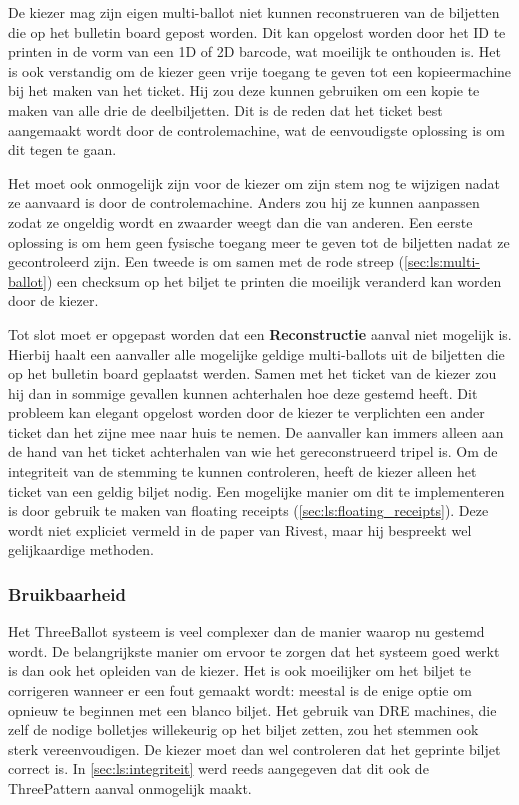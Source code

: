 \npar De kiezer mag zijn eigen multi-ballot niet kunnen reconstrueren van de biljetten die op het bulletin board gepost worden. Dit kan opgelost worden door het ID te printen in de vorm van een 1D of 2D barcode, wat moeilijk te onthouden is. Het is ook verstandig om de kiezer geen vrije toegang te geven tot een kopieermachine bij het maken van het ticket. Hij zou deze kunnen gebruiken om een kopie te maken van alle drie de deelbiljetten. Dit is de reden dat het ticket best aangemaakt wordt door de controlemachine, wat de eenvoudigste oplossing is om dit tegen te gaan.

\npar Het moet ook onmogelijk zijn voor de kiezer om zijn stem nog te wijzigen nadat ze aanvaard is door de controlemachine. Anders zou hij ze kunnen aanpassen zodat ze ongeldig wordt en zwaarder weegt dan die van anderen. Een eerste oplossing is om hem geen fysische toegang meer te geven tot de biljetten nadat ze gecontroleerd zijn. Een tweede is om samen met de rode streep (\ref{sec:ls:multi-ballot}) een checksum op het biljet te printen die moeilijk veranderd kan worden door de kiezer.

\npar Tot slot moet er opgepast worden dat een \textbf{Reconstructie} aanval niet mogelijk is. Hierbij haalt een aanvaller alle mogelijke geldige multi-ballots uit de biljetten die op het bulletin board geplaatst werden. Samen met het ticket van de kiezer zou hij dan in sommige gevallen kunnen achterhalen hoe deze gestemd heeft. Dit probleem kan elegant opgelost worden door de kiezer te verplichten een ander ticket dan het zijne mee naar huis te nemen. De aanvaller kan immers alleen aan de hand van het ticket achterhalen van wie het gereconstrueerd tripel is. Om de integriteit van de stemming te kunnen controleren, heeft de kiezer alleen het ticket van een geldig biljet nodig. Een mogelijke manier om dit te implementeren is door gebruik te maken van floating receipts (\ref{sec:ls:floating_receipts}). Deze wordt niet expliciet vermeld in de paper van Rivest, maar hij bespreekt wel gelijkaardige methoden.\cite{rivest_threeballot}

\subsubsection{Bruikbaarheid}

Het ThreeBallot systeem is veel complexer dan de manier waarop nu gestemd wordt. De belangrijkste manier om ervoor te zorgen dat het systeem goed werkt is dan ook het opleiden van de kiezer. Het is ook moeilijker om het biljet te corrigeren wanneer er een fout gemaakt wordt: meestal is de enige optie om opnieuw te beginnen met een blanco biljet. Het gebruik van DRE machines, die zelf de nodige bolletjes willekeurig op het biljet zetten, zou het stemmen ook sterk vereenvoudigen. De kiezer moet dan wel controleren dat het geprinte biljet correct is. In \ref{sec:ls:integriteit} werd reeds aangegeven dat dit ook de ThreePattern aanval onmogelijk maakt.


